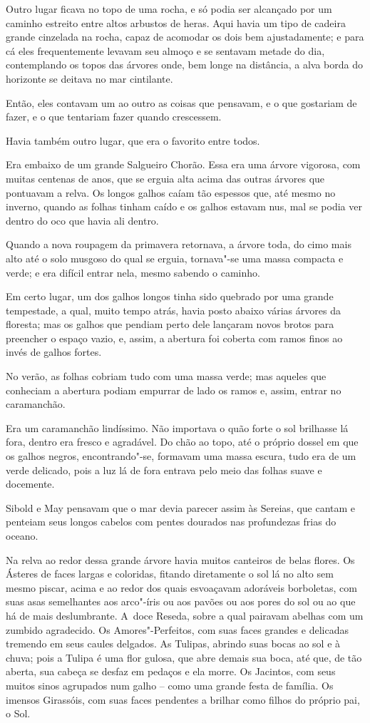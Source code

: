 Outro lugar ficava no topo de uma rocha, e só podia ser alcançado por
um caminho estreito entre altos arbustos de heras. Aqui havia um tipo de
cadeira grande cinzelada na rocha, capaz de acomodar os dois bem
ajustadamente; e para cá eles frequentemente levavam seu almoço e se
sentavam metade do dia, contemplando os topos das árvores onde, bem
longe na distância, a alva borda do horizonte se deitava no mar
cintilante.

Então, eles contavam um ao outro as coisas que pensavam, e o que
gostariam de fazer, e o que tentariam fazer quando crescessem.

Havia também outro lugar, que era o favorito entre todos.

Era embaixo de um grande Salgueiro Chorão. Essa era uma árvore vigorosa,
com muitas centenas de anos, que se erguia alta acima das outras árvores
que pontuavam a relva. Os longos galhos caíam tão espessos que, até
mesmo no inverno, quando as folhas tinham caído e os galhos estavam nus,
mal se podia ver dentro do oco que havia ali dentro.

Quando a nova roupagem da primavera retornava, a árvore toda, do cimo mais
alto até o solo musgoso do qual se erguia, tornava"-se uma massa compacta
e verde; e era difícil entrar nela, mesmo sabendo o caminho.

Em certo lugar, um dos galhos longos tinha sido quebrado por uma grande
tempestade, a qual, muito tempo atrás, havia posto abaixo várias árvores
da floresta; mas os galhos que pendiam perto dele lançaram novos brotos
para preencher o espaço vazio, e, assim, a abertura foi coberta com
ramos finos ao invés de galhos fortes.

No verão, as folhas cobriam tudo com uma massa verde; mas aqueles que
conheciam a abertura podiam empurrar de lado os ramos e, assim, entrar
no caramanchão.

Era um caramanchão lindíssimo. Não importava o quão forte o sol
brilhasse lá fora, dentro era fresco e agradável. Do chão ao topo, até o
próprio dossel em que os galhos negros, encontrando"-se, formavam uma
massa escura, tudo era de um verde delicado, pois a luz lá de fora
entrava pelo meio das folhas suave e docemente.

Sibold e May pensavam que o mar devia parecer assim às Sereias, que
cantam e penteiam seus longos cabelos com pentes dourados nas
profundezas frias do oceano.

Na relva ao redor dessa grande árvore havia muitos canteiros de belas
flores. Os Ásteres de faces largas e coloridas, fitando diretamente o
sol lá no alto sem mesmo piscar, acima e ao redor dos quais esvoaçavam
adoráveis borboletas, com suas asas semelhantes aos arco"-íris ou aos
pavões ou aos pores do sol ou ao que há de mais deslumbrante. A~doce
Reseda, sobre a qual pairavam abelhas com um zumbido agradecido. Os
Amores"-Perfeitos, com suas faces grandes e delicadas tremendo em seus
caules delgados. As Tulipas, abrindo suas bocas ao sol e à chuva; pois a
Tulipa é uma flor gulosa, que abre demais sua boca, até que, de tão
aberta, sua cabeça se desfaz em pedaços e ela morre. Os Jacintos, com
seus muitos sinos agrupados num galho -- como uma grande festa de
família. Os imensos Girassóis, com suas faces pendentes a brilhar como
filhos do próprio pai, o Sol.

